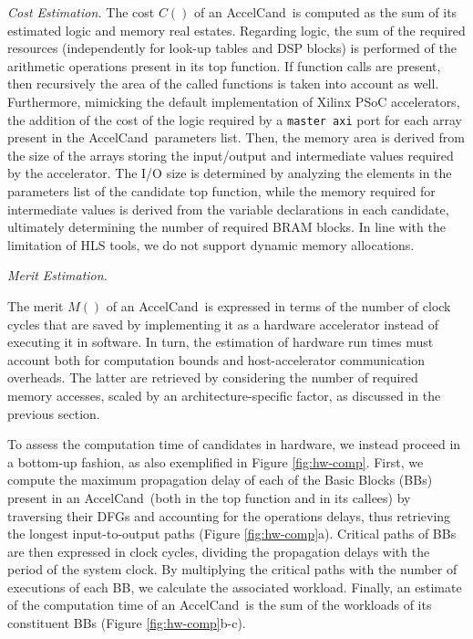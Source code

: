 \documentclass[]{usiinfthesis}
\newcommand{\candidate}{{AccelCand}}
\begin{document}
\emph{Cost Estimation.}
The cost $C()$ of an \candidate\ is computed as the sum of its estimated logic and memory 
real estates. Regarding logic, the sum of the required resources (independently for look-up 
tables and DSP blocks) is performed of the arithmetic operations present in its top function.
If function calls are present, then recursively the area of the called functions is taken into
account as well. Furthermore, mimicking the default implementation of Xilinx PSoC accelerators, 
the addition of the cost of the logic required by a \texttt{master  axi} port for each array 
present in the \candidate\ parameters list.
Then, the memory area is derived from the size of the arrays storing
the input/output and intermediate values required by the
accelerator. The I/O size is determined by analyzing the elements in
the parameters list of the candidate top function, while the memory
required for intermediate values is derived from the variable
declarations in each candidate, ultimately determining the number of
required BRAM blocks.
In line with the limitation of HLS tools, we do not  support dynamic memory
allocations.
\par


\emph{Merit Estimation.}

The merit $M()$ of an \candidate\ is expressed in terms of the number
of clock cycles that are saved by implementing it as a hardware
accelerator instead of executing it in software.  In turn, the
estimation of hardware run times must account both for computation
bounds and host-accelerator communication overheads.  The latter are
retrieved by considering the number of required memory accesses,
scaled by an architecture-specific factor, as discussed in the
previous section.\par

To assess the computation time of candidates in hardware, we instead
proceed in a bottom-up fashion, as also exemplified in Figure
\ref{fig:hw-comp}. First, we compute the maximum propagation delay of
each of the Basic Blocks (BBs) present in an \candidate\ (both in the
top function and in its callees) by traversing their DFGs and
accounting for the operations delays, thus retrieving the longest
input-to-output paths (Figure \ref{fig:hw-comp}a).  Critical paths of
BBs are then expressed in clock cycles, dividing the propagation
delays with the period of the system clock. By multiplying the
critical paths with the number of executions of each BB, we calculate
the associated workload. Finally, an estimate of the computation time
of an \candidate\ is the sum of the workloads of its constituent BBs
(Figure \ref{fig:hw-comp}b-c).
\end{document}
